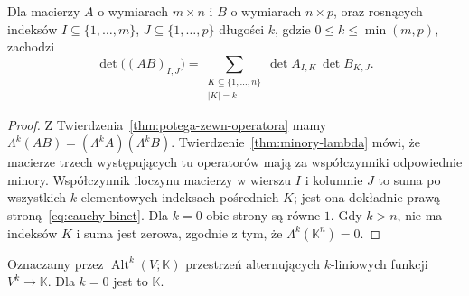 \begin{wniosek}
\label{cor:cauchy-binet}
Dla macierzy $A$ o wymiarach $m\times n$ i $B$ o wymiarach
$n\times p$, oraz rosnących indeksów $I\subseteq\{1,\ldots,m\}$,
$J\subseteq\{1,\ldots,p\}$ długości $k$, gdzie $0\leq k\leq\min(m,p)$,
zachodzi
\begin{equation}\label{eq:cauchy-binet}
 \det\bigl((AB)_{I,J}\bigr)
 =\sum_{\substack{K\subseteq\{1,\ldots,n\}\\ |K|=k}}
 \det A_{I,K}\,\det B_{K,J}.
\end{equation}
\end{wniosek}
\begin{proof}
Z Twierdzenia~\ref{thm:potega-zewn-operatora} mamy
$\Lambda^k(AB)=(\Lambda^k A)(\Lambda^k B)$.
Twierdzenie~\ref{thm:minory-lambda} mówi, że macierze
trzech występujących tu operatorów mają za współczynniki
odpowiednie minory. Współczynnik iloczynu macierzy w
wierszu $I$ i kolumnie $J$ to suma po wszystkich
$k$-elementowych indeksach pośrednich $K$; jest ona
dokładnie prawą stroną~\eqref{eq:cauchy-binet}.
Dla $k=0$ obie strony są równe $1$. Gdy $k>n$,
nie ma indeksów $K$ i suma jest zerowa, zgodnie z tym,
że $\Lambda^k(\mathbb K^n)=0$.
\end{proof}

Oznaczamy przez $\operatorname{Alt}^k(V;\mathbb K)$ przestrzeń
alternujących $k$-liniowych funkcji $V^k\to\mathbb K$.
Dla $k=0$ jest to $\mathbb K$.


